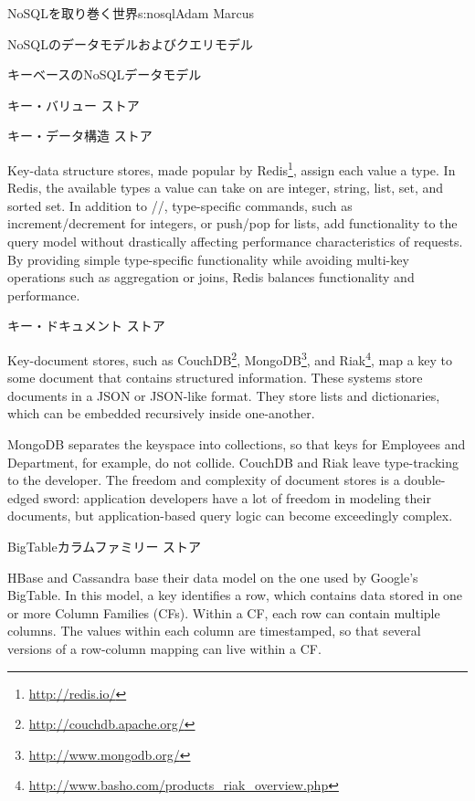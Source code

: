 \begin{aosachapter}{NoSQLを取り巻く世界}{s:nosql}{Adam Marcus}
\begin{aosasect1}{NoSQLのデータモデルおよびクエリモデル}
\begin{aosasect2}{キーベースのNoSQLデータモデル}
\begin{aosasect3}{キー・バリュー ストア}
\end{aosasect3}

\begin{aosasect3}{キー・データ構造 ストア}

Key-data structure stores, made popular by Redis\footnote{\url{http://redis.io/}}, assign each value a
type.  In Redis, the available types a value can take on are integer,
string, list, set, and sorted set.  In addition to
//, type-specific commands, such as
increment/decrement for integers, or push/pop for lists, add
functionality to the query model without drastically affecting
performance characteristics of requests.  By providing simple
type-specific functionality while avoiding multi-key operations such as
aggregation or joins, Redis balances functionality and performance.

\end{aosasect3}

\begin{aosasect3}{キー・ドキュメント ストア}

Key-document stores, such as CouchDB\footnote{\url{http://couchdb.apache.org/}}, MongoDB\footnote{\url{http://www.mongodb.org/}}, and Riak\footnote{\url{http://www.basho.com/products_riak_overview.php}}, map a key to
some document that contains structured information.  These systems
store documents in a JSON or JSON-like format.  They store lists and
dictionaries, which can be embedded recursively inside one-another.

MongoDB separates the keyspace into collections, so that keys for
Employees and Department, for example, do not collide.  CouchDB and
Riak leave type-tracking to the developer.  The freedom and complexity
of document stores is a double-edged sword: application developers
have a lot of freedom in modeling their documents, but
application-based query logic can become exceedingly complex.

\end{aosasect3}

\begin{aosasect3}{BigTableカラムファミリー ストア}

HBase and Cassandra base their data model on the one used by Google's
BigTable.  In this model, a key identifies a row, which contains data
stored in one or more Column Families (CFs).  Within a CF, each row
can contain multiple columns.  The values within each column are
timestamped, so that several versions of a row-column mapping can live
within a CF.


\end{aosasect3}
\end{aosasect2}
\end{aosasect1}
\end{aosachapter}
